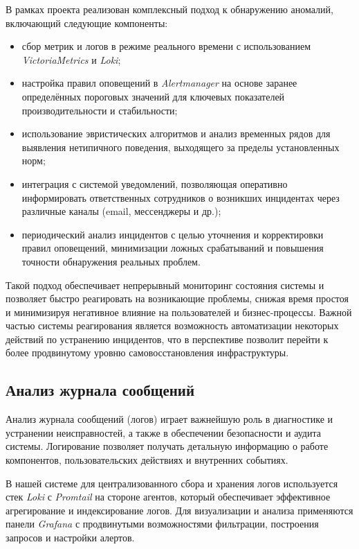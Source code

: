 В рамках проекта реализован комплексный подход к обнаружению аномалий, включающий следующие компоненты:

\begin{itemize}
    \item сбор метрик и логов в режиме реального времени с использованием \textit{VictoriaMetrics} и \textit{Loki};
    \item настройка правил оповещений в \textit{Alertmanager} на основе заранее определённых пороговых значений для ключевых показателей производительности и стабильности;
    \item использование эвристических алгоритмов и анализ временных рядов для выявления нетипичного поведения, выходящего за пределы установленных норм;
    \item интеграция с системой уведомлений, позволяющая оперативно информировать ответственных сотрудников о возникших инцидентах через различные каналы (email, мессенджеры и др.);
    \item периодический анализ инцидентов с целью уточнения и корректировки правил оповещений, минимизации ложных срабатываний и повышения точности обнаружения реальных проблем.
\end{itemize}

Такой подход обеспечивает непрерывный мониторинг состояния системы и позволяет быстро реагировать на возникающие проблемы, снижая время простоя и минимизируя негативное влияние на пользователей и бизнес-процессы. Важной частью системы реагирования является возможность автоматизации некоторых действий по устранению инцидентов, что в перспективе позволит перейти к более продвинутому уровню самовосстановления инфраструктуры.

\subsection{Анализ журнала сообщений}

Анализ журнала сообщений (логов) играет важнейшую роль в диагностике и устранении неисправностей, а также в обеспечении безопасности и аудита системы. Логирование позволяет получать детальную информацию о работе компонентов, пользовательских действиях и внутренних событиях.

В нашей системе для централизованного сбора и хранения логов используется стек \textit{Loki} с \textit{Promtail} на стороне агентов, который обеспечивает эффективное агрегирование и индексирование логов. Для визуализации и анализа применяются панели \textit{Grafana} с продвинутыми возможностями фильтрации, построения запросов и настройки алертов.

